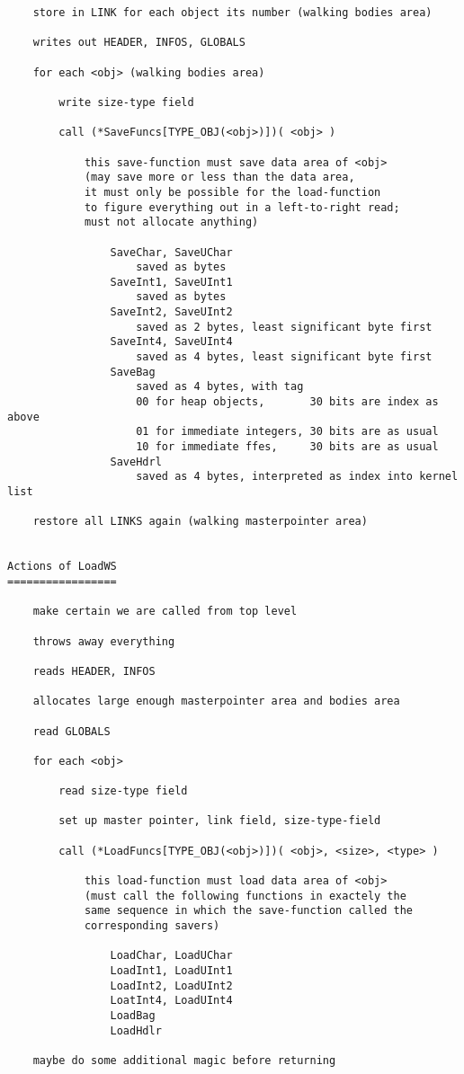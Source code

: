 \documentclass[11pt]{article}
\begin{document}
\begin{verbatim}
    store in LINK for each object its number (walking bodies area)

    writes out HEADER, INFOS, GLOBALS

    for each <obj> (walking bodies area)

        write size-type field

        call (*SaveFuncs[TYPE_OBJ(<obj>)])( <obj> )

            this save-function must save data area of <obj>
            (may save more or less than the data area,
            it must only be possible for the load-function
            to figure everything out in a left-to-right read;
            must not allocate anything)

                SaveChar, SaveUChar
                    saved as bytes
                SaveInt1, SaveUInt1
                    saved as bytes
                SaveInt2, SaveUInt2
                    saved as 2 bytes, least significant byte first
                SaveInt4, SaveUInt4
                    saved as 4 bytes, least significant byte first
                SaveBag
                    saved as 4 bytes, with tag
                    00 for heap objects,       30 bits are index as above
                    01 for immediate integers, 30 bits are as usual
                    10 for immediate ffes,     30 bits are as usual
                SaveHdrl
                    saved as 4 bytes, interpreted as index into kernel list

    restore all LINKS again (walking masterpointer area)


Actions of LoadWS
=================

    make certain we are called from top level

    throws away everything

    reads HEADER, INFOS

    allocates large enough masterpointer area and bodies area

    read GLOBALS

    for each <obj>

        read size-type field

        set up master pointer, link field, size-type-field

        call (*LoadFuncs[TYPE_OBJ(<obj>)])( <obj>, <size>, <type> )

            this load-function must load data area of <obj>
            (must call the following functions in exactely the
            same sequence in which the save-function called the
            corresponding savers)

                LoadChar, LoadUChar
                LoadInt1, LoadUInt1
                LoadInt2, LoadUInt2
                LoatInt4, LoadUInt4
                LoadBag
                LoadHdlr

    maybe do some additional magic before returning
\end{verbatim}
\end{document}
